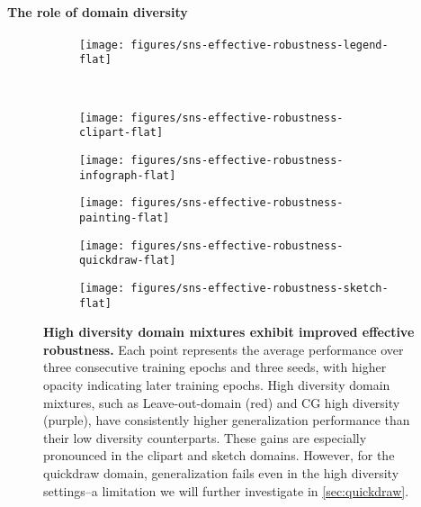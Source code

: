 \paragraph{The role of domain diversity}
\begin{figure*}[t]
    \begin{subfigure}[c]{\textwidth}
        \centering
        \texttt{[image: figures/sns-effective-robustness-legend-flat]}\smallskip
    \end{subfigure} \\
    \begin{subfigure}[c]{0.195\textwidth}
        \centering
        \texttt{[image: figures/sns-effective-robustness-clipart-flat]}
    \end{subfigure}
    \begin{subfigure}[c]{0.195\textwidth}
        \centering
        \texttt{[image: figures/sns-effective-robustness-infograph-flat]}
    \end{subfigure}
    \begin{subfigure}[c]{0.195\textwidth}
        \centering
        \texttt{[image: figures/sns-effective-robustness-painting-flat]}
    \end{subfigure}
    \begin{subfigure}[c]{0.195\textwidth}
        \centering
        \texttt{[image: figures/sns-effective-robustness-quickdraw-flat]}
    \end{subfigure}
    \begin{subfigure}[c]{0.195\textwidth}
        \centering
        \texttt{[image: figures/sns-effective-robustness-sketch-flat]}
    \end{subfigure}
    \caption{\textbf{High diversity domain mixtures exhibit improved effective robustness.} Each point represents the average performance over three consecutive training epochs and three seeds, with higher opacity indicating later training epochs. High diversity domain mixtures, such as Leave-out-domain (red) and CG high diversity (purple), have consistently higher generalization performance than their low diversity counterparts. These gains are especially pronounced in the clipart and sketch domains. However, for the quickdraw domain, generalization fails even in the high diversity settings--a limitation we will further investigate in \cref{sec:quickdraw}.
  }
  \label{fig:effective-robustness}
\end{figure*}

